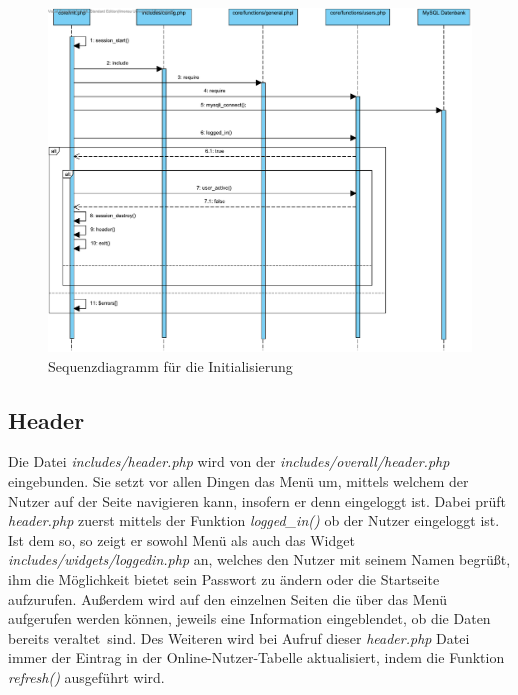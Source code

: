 \documentclass[fontsize = 12pt, paper = a4]{scrreprt}
\begin{document}
\begin{figure}[h]
\centering
\includegraphics[scale = 0.55]{initialisierung}
\caption[Sequenzdiagramm f\"{u}r die Initialisierung]{Sequenzdiagramm f\"{u}r die Initialisierung}
\label{init}
\end{figure}

\newpage
\subsection{Header}
Die Datei \textit{includes/header.php} wird von der \textit{includes/overall/header.php} eingebunden. Sie setzt vor allen Dingen das Menü um, mittels welchem der Nutzer auf der Seite navigieren kann, insofern er denn eingeloggt ist. Dabei prüft \textit{header.php} zuerst mittels der Funktion \textit{logged\_in()} ob der Nutzer eingeloggt ist. Ist dem so, so zeigt er sowohl Menü als auch das Widget \textit{includes/widgets/loggedin.php} an, welches den Nutzer mit seinem Namen begrüßt, ihm die Möglichkeit bietet sein Passwort zu ändern oder die Startseite aufzurufen. Außerdem wird auf den einzelnen Seiten die über das Menü aufgerufen werden können, jeweils eine Information eingeblendet, ob die Daten bereits \glqq veraltet\grqq \ sind. Des Weiteren wird bei Aufruf dieser \textit{header.php} Datei immer der Eintrag in der Online-Nutzer-Tabelle aktualisiert, indem die Funktion \textit{refresh()} ausgeführt wird.
\end{document}
